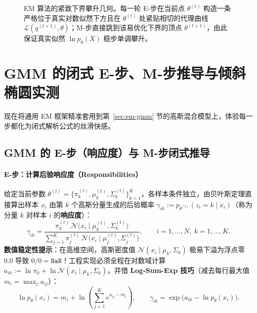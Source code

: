 \begin{figure}[htbp]
\caption{EM 算法的紧致下界攀升几何。每一轮 E-步在当前点 $\theta^{(t)}$ 构造一条严格位于真实对数似然下方且在 $\theta^{(t)}$ 处紧贴相切的代理曲线 $\mathcal{L}(q^{(t+1)}, \theta)$；M-步直接跳到该易优化下界的顶点 $\theta^{(t+1)}$，由此保证真实似然 $\ln p_\theta(X)$ 稳步单调攀升。}
\label{fig:em-tangency}
\end{figure}

\section{GMM 的闭式 E-步、M-步推导与倾斜椭圆实测}\label{sec:em-gmm-derivation}

现在将通用 EM 框架精准套用到第~\ref{sec:em-gmm} 节的高斯混合模型上，体验每一步都化为闭式解析公式的丝滑快感。

\subsection{GMM 的 E-步（响应度）与 M-步闭式推导}

\paragraph{E-步：计算后验响应度（Responsibilities）}
给定当前参数 $\theta^{(t)} = \{\pi_k^{(t)}, \mu_k^{(t)}, \Sigma_k^{(t)}\}_{k=1}^K$，各样本条件独立，由贝叶斯定理直接算出样本 $x_i$ 由第 $k$ 个高斯分量生成的后验概率 $\gamma_{ik} := p_{\theta^{(t)}}(z_i = k \mid x_i)$（称为分量 $k$ 对样本 $i$ 的\textbf{响应度}）：
\begin{equation}\label{eq:gmm-estep}
  \gamma_{ik} = \frac{\pi_k^{(t)}\,\mathcal{N}\big(x_i \mid \mu_k^{(t)}, \Sigma_k^{(t)}\big)}{\sum_{j=1}^{K} \pi_j^{(t)}\,\mathcal{N}\big(x_i \mid \mu_j^{(t)}, \Sigma_j^{(t)}\big)}, \qquad i=1,\dots,N,\; k=1,\dots,K.
\end{equation}
\textbf{数值稳定性提示}：在高维空间，高斯密度值 $\mathcal{N}(x_i \mid \mu_k, \Sigma_k)$ 极易下溢为浮点零 $0.0$ 导致 $0/0 = \texttt{NaN}$！工程实现必须全程在对数域计算 $a_{ik} := \ln \pi_k + \ln \mathcal{N}(x_i \mid \mu_k, \Sigma_k)$，并借 \textbf{Log-Sum-Exp 技巧}（减去每行最大值 $m_i = \max_j a_{ij}$）：
\[
  \ln p_\theta(x_i) = m_i + \ln\!\left(\sum_{j=1}^{K} e^{a_{ij} - m_i}\right), \qquad
  \gamma_{ik} = \exp\!\big(a_{ik} - \ln p_\theta(x_i)\big).
\]

